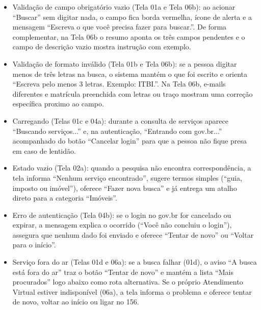 \documentclass[
  12pt,
  oneside,
  a4paper,
  chapter=TITLE,
  section=TITLE,
  english,
  brazilian
]{abntex2}
\newif\ifcodigo
\begin{document}
\begin{itemize}
  \item Validação de campo obrigatório vazio (Tela 01a e Tela 06b): ao acionar ``Buscar'' sem digitar nada, o campo fica borda vermelha, ícone de alerta e a mensagem ``Escreva o que você precisa fazer para buscar.''. De forma complementar, na Tela 06b o resumo aponta os três campos pendentes e o campo de descrição vazio mostra instrução com exemplo.
  \item Validação de formato inválido (Tela 01b e Tela 06b): se a pessoa digitar menos de três letras na busca, o sistema mantém o que foi escrito e orienta ``Escreva pelo menos 3 letras. Exemplo: ITBI.''. Na Tela 06b, e-mails diferentes e matrícula preenchida com letras ou traço mostram uma correção específica proximo ao campo.
  \item Carregando (Telas 01c e 04a): durante a consulta de serviços aparece ``Buscando serviços...'' e, na autenticação, ``Entrando com gov.br...'' acompanhado do botão ``Cancelar login'' para que a pessoa não fique presa em caso de lentidão.
  \item Estado vazio (Tela 02a): quando a pesquisa não encontra correspondência, a tela informa ``Nenhum serviço encontrado'', sugere termos simples (``guia, imposto ou imóvel''), oferece ``Fazer nova busca'' e já entrega um atalho direto para a categoria ``Imóveis''.
  \item Erro de autenticação (Tela 04b): se o login no gov.br for cancelado ou expirar, a mensagem explica o ocorrido (``Você não concluiu o login''), assegura que nenhum dado foi enviado e oferece ``Tentar de novo'' ou ``Voltar para o início''.
  \item Serviço fora do ar (Telas 01d e 06a): se a busca falhar (01d), o aviso ``A busca está fora do ar'' traz o botão ``Tentar de novo'' e mantém a lista ``Mais procurados'' logo abaixo como rota alternativa. Se o próprio Atendimento Virtual estiver indisponível (06a), a tela informa o problema e oferece tentar de novo, voltar ao início ou ligar no 156.
\end{itemize}

\ifcodigo
\chapter{Validação na tela em código}\label{cap:validacao}
\chapter{Auditoria automática de acessibilidade}\label{cap:auditoria}
\fi
\end{document}

